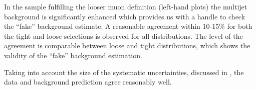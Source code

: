 In the sample fulfilling the looser muon definition (left-hand plots) the multijet background is significantly enhanced which provides us with a handle to check the ``fake'' background estimate. 
A reasonable agreement within 10-15$\%$ for both the tight and loose selections is observed for all distributions.
The level of the agreement is comparable between loose and tight distributions, which shows the validity of the ``fake'' background estimation.

Taking into account the size of the systematic uncertainties, discussed in , the data and background prediction agree reasonably well. 




